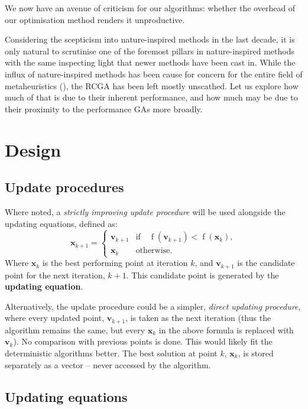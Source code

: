 \documentclass[
  a4paper,
  DIV=11,
  numbers=noendperiod]{scrartcl}
\newcommand{\B}[1]{\boldsymbol{#1}}
\newcommand{\+}{\phantom{-}}
\newcommand{\op}[2]{\operatorname{#1}\left(#2\right)}
\begin{document}
We now have an avenue of criticism for our algorithms: whether the
overhead of our optimisation method renders it unproductive.

Considering the scepticism into nature-inspired methods in the last
decade, it is only natural to scrutinise one of the foremost pillars in
nature-inspired methods with the same inspecting light that newer
methods have been cast in. While the influx of nature-inspired methods
has been cause for concern for the entire field of metaheuristics
(), the RCGA has been left
mostly unscathed. Let us explore how much of that is due to their
inherent performance, and how much may be due to their proximity to the
performance GAs more broadly.

\newpage

\section{Design}\label{design}

\subsection{Update procedures}\label{update-procedures}

Where noted, a \emph{strictly improving update procedure} will be used
alongside the updating equations, defined as:
\[\B x_{k+1} = \begin{cases}\B v_{k+1}&\text{if} \quad \op{f}{\B v_{k+1}}< \op{f}{\B x_k},\\\B x_k & \text{otherwise.}\end{cases}\]
Where \(\B x_k\) is the best performing point at iteration \(k\), and
\(\B v_{k+1}\) is the candidate point for the next iteration, \(k+1\).
This candidate point is generated by the \textbf{updating equation}.

Alternatively, the update procedure could be a simpler, \emph{direct
updating procedure}, where every updated point, \(\B v_{k+1}\), is taken
as the next iteration (thus the algorithm remains the same, but every
\(\B x_k\) in the above formula is replaced with \(\B v_k\)). No
comparison with previous points is done. This would likely fit the
deterministic algorithms better. The best solution at point \(k\),
\(\B x_k\), is stored separately as a vector -- never accessed by the
algorithm.

\subsection{Updating equations}\label{updating-equations}
\end{document}
